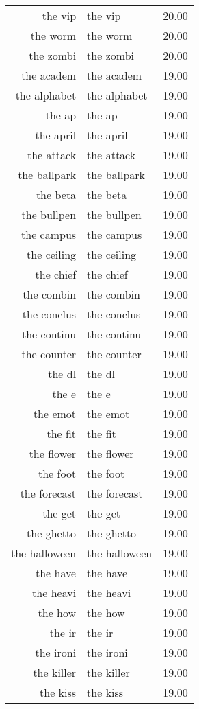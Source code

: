 \begin{table}[ht]
\begin{tabular}{rlr}
  the vip & the vip & 20.00 \\ 
  the worm & the worm & 20.00 \\ 
  the zombi & the zombi & 20.00 \\ 
  the academ & the academ & 19.00 \\ 
  the alphabet & the alphabet & 19.00 \\ 
  the ap & the ap & 19.00 \\ 
  the april & the april & 19.00 \\ 
  the attack & the attack & 19.00 \\ 
  the ballpark & the ballpark & 19.00 \\ 
  the beta & the beta & 19.00 \\ 
  the bullpen & the bullpen & 19.00 \\ 
  the campus & the campus & 19.00 \\ 
  the ceiling & the ceiling & 19.00 \\ 
  the chief & the chief & 19.00 \\ 
  the combin & the combin & 19.00 \\ 
  the conclus & the conclus & 19.00 \\ 
  the continu & the continu & 19.00 \\ 
  the counter & the counter & 19.00 \\ 
  the dl & the dl & 19.00 \\ 
  the e & the e & 19.00 \\ 
  the emot & the emot & 19.00 \\ 
  the fit & the fit & 19.00 \\ 
  the flower & the flower & 19.00 \\ 
  the foot & the foot & 19.00 \\ 
  the forecast & the forecast & 19.00 \\ 
  the get & the get & 19.00 \\ 
  the ghetto & the ghetto & 19.00 \\ 
  the halloween & the halloween & 19.00 \\ 
  the have & the have & 19.00 \\ 
  the heavi & the heavi & 19.00 \\ 
  the how & the how & 19.00 \\ 
  the ir & the ir & 19.00 \\ 
  the ironi & the ironi & 19.00 \\ 
  the killer & the killer & 19.00 \\ 
  the kiss & the kiss & 19.00 \\ 

\end{tabular}
\end{table}
